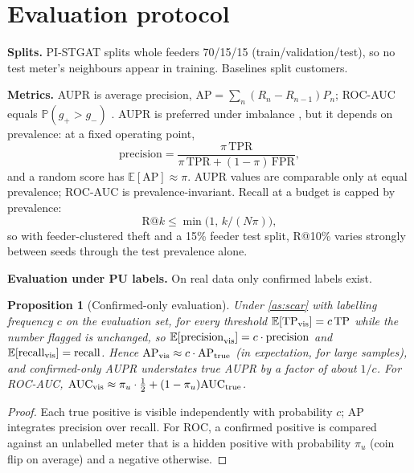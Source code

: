 \documentclass[11pt,a4paper]{article}
\theoremstyle{plain}
\newtheorem{proposition}{Proposition}
\theoremstyle{definition}
\theoremstyle{remark}
\newcommand{\E}{\mathbb{E}}
\newcommand{\Prob}{\mathbb{P}}
\begin{document}
\section{Evaluation protocol}
\textbf{Splits.} PI-STGAT splits whole feeders 70/15/15 (train/validation/test), so no test meter's neighbours appear in training. Baselines split customers.

\textbf{Metrics.} AUPR is average precision, $\mathrm{AP}=\sum_n(R_n-R_{n-1})P_n$; ROC-AUC equals $\Prob(g_+>g_-)$ \citep{hanley1982}. AUPR is preferred under imbalance \citep{davis2006,saito2015}, but it depends on prevalence: at a fixed operating point,
\begin{equation}
\mathrm{precision}=\frac{\pi\,\mathrm{TPR}}{\pi\,\mathrm{TPR}+(1-\pi)\,\mathrm{FPR}},
\end{equation}
and a random score has $\E[\mathrm{AP}]\approx\pi$. AUPR values are comparable only at equal prevalence; ROC-AUC is prevalence-invariant. Recall at a budget is capped by prevalence:
\begin{equation}
\mathrm{R@}k\le\min\big(1,\,k/(N\pi)\big),
\end{equation}
so with feeder-clustered theft and a 15\% feeder test split, R@10\% varies strongly between seeds through the test prevalence alone.

\textbf{Evaluation under PU labels.} On real data only confirmed labels exist.
\begin{proposition}[Confirmed-only evaluation]
\label{prop:pueval}
Under \cref{as:scar} with labelling frequency $c$ on the evaluation set, for every threshold $\E[\mathrm{TP}_{\rm vis}]=c\,\mathrm{TP}$ while the number flagged is unchanged, so $\E[\mathrm{precision}_{\rm vis}]=c\cdot\mathrm{precision}$ and $\E[\mathrm{recall}_{\rm vis}]=\mathrm{recall}$. Hence $\mathrm{AP}_{\rm vis}\approx c\cdot\mathrm{AP}_{\rm true}$ (in expectation, for large samples), and confirmed-only AUPR understates true AUPR by a factor of about $1/c$. For ROC-AUC, $\mathrm{AUC}_{\rm vis}\approx\pi_u\cdot\tfrac12+(1-\pi_u)\mathrm{AUC}_{\rm true}$.
\end{proposition}
\begin{proof}
Each true positive is visible independently with probability $c$; AP integrates precision over recall. For ROC, a confirmed positive is compared against an unlabelled meter that is a hidden positive with probability $\pi_u$ (coin flip on average) and a negative otherwise.
\end{proof}
\end{document}
